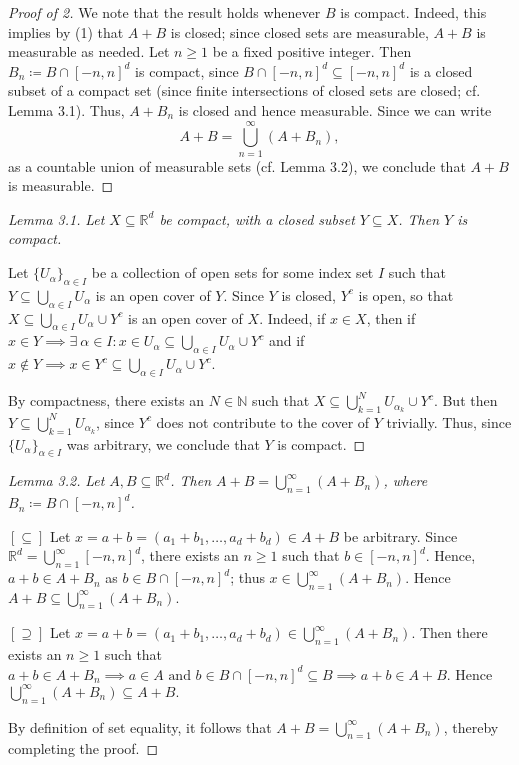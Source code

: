 \begin{proof}[Proof of 2]
	We note that the result holds whenever \( B \) is compact. Indeed, this implies by (1) that \( A+B \) is closed; since closed sets are measurable, \( A+B \) is measurable as needed. Let \( n \geq 1 \) be a fixed positive integer. Then \( B_n \coloneqq B \cap [-n,n]^{d}  \) is compact, since \( B \cap [-n,n]^{d} \subseteq [-n,n]^{d}   \) is a closed subset of a compact set (since finite intersections of closed sets are closed; cf. Lemma 3.1). Thus, \( A+B_n \) is closed and hence measurable. Since we can write \[A+B = \bigcup_{n=1}^{\infty} (A+B_n),\] as a countable union of measurable sets (cf. Lemma 3.2), we conclude that \( A+B \) is measurable.
\end{proof}
\begin{proof}[Lemma 3.1]
	\emph{Let \( X \subseteq \mathbb{R}^{d}  \) be compact, with a closed subset \( Y \subseteq X \). Then \( Y \) is compact.} 

	Let \( \{ U_\alpha \}_{\alpha \in I}  \) be a collection of open sets for some index set \( I \) such that \( Y \subseteq \bigcup_{\alpha \in I}^{} U_\alpha \) is an open cover of \( Y \). Since \( Y \) is closed, \( Y^{c}  \) is open, so that \( X \subseteq \bigcup_{\alpha \in I}^{} U_\alpha \cup Y^{c}  \) is an open cover of \( X \). Indeed, if \( x \in X \), then if \( x \in Y \implies \exists \ \alpha \in I : x \in U_\alpha \subseteq \bigcup_{\alpha \in I}^{} U_\alpha \cup Y^{c}  \) and if \( x \notin Y \implies x \in Y^{c} \subseteq \bigcup_{\alpha \in I}^{} U_\alpha \cup Y^{c}   \).

	By compactness, there exists an \( N \in \mathbb{N}  \) such that \( X \subseteq \bigcup_{k=1}^{N} U_{\alpha_k} \cup Y^{c}   \). But then \( Y \subseteq \bigcup_{k=1}^{N} U_{\alpha_k} \), since \( Y^{c}  \) does not contribute to the cover of \( Y \) trivially. Thus, since \( \{ U_\alpha \}_{\alpha \in I}  \) was arbitrary, we conclude that \( Y \) is compact.
\end{proof}
\begin{proof}[Lemma 3.2]
	\emph{Let \( A,B \subseteq \mathbb{R}^{d}  \). Then \( A+B = \bigcup_{n=1}^{\infty} (A+B_n) \), where \( B_n \coloneqq B \cap [-n,n]^{d}  \).}

	\( [\subseteq ] \) Let \( x = a+b = (a_1 + b_1, \hdots , a_d + b_d) \in A+B \) be arbitrary. Since \( \mathbb{R}^{d} = \bigcup_{n=1}^{\infty} [-n,n]^{d}  \), there exists an \( n \geq 1 \) such that \( b \in [-n ,n]^{d}  \). Hence, \( a + b \in A + B_n \) as \( b \in B \cap [-n,n]^{d}  \); thus \( x \in \bigcup_{n=1}^{\infty} (A+B_n) \). Hence \( A+B \subseteq \bigcup_{n=1}^{\infty} (A+B_n). \)

	\( [\supseteq] \) Let \( x = a+b = (a_1 + b_1, \hdots , a_d+b_d) \in \bigcup_{n=1}^{\infty} (A+B_n). \) Then there exists an \( n \geq 1 \) such that \( a+b \in A+B_n \implies a \in A \mbox{ and }b \in B\cap [-n,n]^{d} \subseteq B \implies a+b \in A+B  \). Hence \( \bigcup_{n=1}^{\infty} (A+B_n) \subseteq A+B. \)

	By definition of set equality, it follows that \( A+B = \bigcup_{n=1}^{\infty} (A+B_n) \), thereby completing the proof.
\end{proof}

